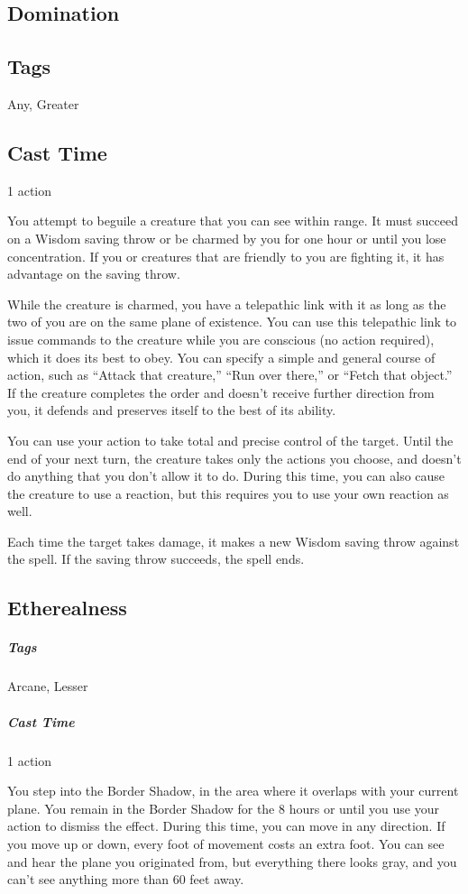 \subsection{Domination}\label{spell:domination}
\subsection*{Tags} Any, Greater
\subsection*{Cast Time} 1 action

You attempt to beguile a creature that you can see within range. It must succeed on a Wisdom saving throw or be charmed by you for one hour or until you lose concentration. If you or creatures that are friendly to you are fighting it, it has advantage on the saving throw.

While the creature is charmed, you have a telepathic link with it as long as the two of you are on the same plane of existence. You can use this telepathic link to issue commands to the creature while you are conscious (no action required), which it does its best to obey. You can specify a simple and general course of action, such as “Attack that creature,” “Run over there,” or “Fetch that object.” If the creature completes the order and doesn't receive further direction from you, it defends and preserves itself to the best of its ability.

You can use your action to take total and precise control of the target. Until the end of your next turn, the creature takes only the actions you choose, and doesn't do anything that you don't allow it to do. During this time, you can also cause the creature to use a reaction, but this requires you to use your own reaction as well.

Each time the target takes damage, it makes a new Wisdom saving throw against the spell. If the saving throw succeeds, the spell ends.

\subsection{Etherealness}\label{spell:etherealness}
\subparagraph*{Tags} Arcane, Lesser
\subparagraph*{Cast Time} 1 action

You step into the Border Shadow, in the area where it overlaps with your current plane. You remain in the Border Shadow for the 8 hours or until you use your action to dismiss the effect. During this time, you can move in any direction. If you move up or down, every foot of movement costs an extra foot. You can see and hear the plane you originated from, but everything there looks gray, and you can't see anything more than 60 feet away.

